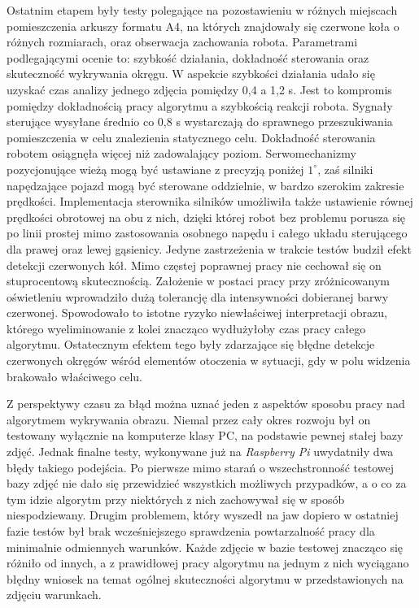 Ostatnim etapem były testy polegające na pozostawieniu w różnych miejscach pomieszczenia arkuszy formatu A4, na których znajdowały się czerwone koła o różnych rozmiarach, oraz obserwacja zachowania robota. Parametrami podlegającymi ocenie to: szybkość działania, dokładność sterowania oraz skuteczność wykrywania okręgu. W aspekcie szybkości działania udało się uzyskać czas analizy jednego zdjęcia pomiędzy 0,4 a 1,2 s. Jest to kompromis pomiędzy dokładnością pracy algorytmu a szybkością reakcji robota. Sygnały sterujące wysyłane średnio co 0,8 s wystarczają do sprawnego przeszukiwania pomieszczenia w celu znalezienia statycznego celu. Dokładność sterowania robotem osiągnęła więcej niż zadowalający poziom. Serwomechanizmy pozycjonujące wieżą mogą być ustawiane z precyzją poniżej $1^\circ$, zaś silniki napędzające pojazd mogą być sterowane oddzielnie, w bardzo szerokim zakresie prędkości. Implementacja sterownika silników umożliwiła także ustawienie równej prędkości obrotowej na obu z nich, dzięki której robot bez problemu porusza się po linii prostej mimo zastosowania osobnego napędu i całego układu sterującego dla prawej oraz lewej gąsienicy. Jedyne zastrzeżenia w trakcie testów budził efekt detekcji czerwonych kół. Mimo częstej poprawnej pracy nie cechował się on stuprocentową skutecznością. Założenie w postaci pracy przy zróżnicowanym oświetleniu wprowadziło dużą tolerancję dla intensywności dobieranej barwy czerwonej. Spowodowało to istotne ryzyko niewłaściwej interpretacji obrazu, którego wyeliminowanie z kolei znacząco wydłużyłoby czas pracy całego algorytmu. Ostatecznym efektem tego były zdarzające się błędne detekcje czerwonych okręgów wśród elementów otoczenia w sytuacji, gdy w polu widzenia brakowało właściwego celu.

Z perspektywy czasu za błąd można uznać jeden z aspektów sposobu pracy nad algorytmem wykrywania obrazu. Niemal przez cały okres rozwoju był on testowany wyłącznie na komputerze klasy PC, na podstawie pewnej stałej bazy zdjęć. Jednak finalne testy, wykonywane już na \textit{Raspberry Pi} uwydatniły dwa błędy takiego podejścia. Po pierwsze mimo starań o wszechstronność testowej bazy zdjęć nie dało się przewidzieć wszystkich możliwych przypadków, a o co za tym idzie algorytm przy niektórych z nich zachowywał się w sposób niespodziewany. Drugim problemem, który wyszedł na jaw dopiero w ostatniej fazie testów był brak wcześniejszego sprawdzenia powtarzalność pracy dla minimalnie odmiennych warunków. Każde zdjęcie w bazie testowej znacząco się różniło od innych, a z prawidłowej pracy algorytmu na jednym z nich wyciągano błędny wniosek na temat ogólnej skuteczności algorytmu w przedstawionych na zdjęciu warunkach.